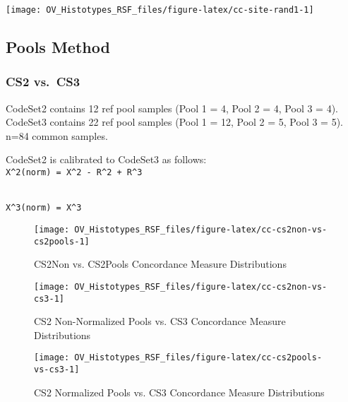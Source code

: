 \documentclass[
]{report}
\begin{document}
\begin{center}\texttt{[image: OV\_Histotypes\_RSF\_files/figure-latex/cc-site-rand1-1]} \end{center}

\hypertarget{pools-method-1}{%
\subsection{Pools Method}\label{pools-method-1}}

\hypertarget{cs2-vs.-cs3}{%
\subsubsection{CS2 vs.~CS3}\label{cs2-vs.-cs3}}

CodeSet2 contains 12 ref pool samples (Pool 1 = 4, Pool 2 = 4, Pool 3 = 4). CodeSet3 contains 22 ref pool samples (Pool 1 = 12, Pool 2 = 5, Pool 3 = 5). n=84 common samples.

CodeSet2 is calibrated to CodeSet3 as follows:\\
\texttt{X\^{}2(norm)\ =\ X\^{}2\ -\ R\^{}2\ +\ R\^{}3}\strut \\
\texttt{X\^{}3(norm)\ =\ X\^{}3}

\begin{figure}[H]

{\centering \texttt{[image: OV\_Histotypes\_RSF\_files/figure-latex/cc-cs2non-vs-cs2pools-1]} 

}

\caption{CS2Non vs. CS2Pools Concordance Measure Distributions}\label{fig:cc-cs2non-vs-cs2pools}
\end{figure}

\begin{figure}[H]

{\centering \texttt{[image: OV\_Histotypes\_RSF\_files/figure-latex/cc-cs2non-vs-cs3-1]} 

}

\caption{CS2 Non-Normalized Pools vs. CS3 Concordance Measure Distributions}\label{fig:cc-cs2non-vs-cs3}
\end{figure}

\begin{figure}[H]

{\centering \texttt{[image: OV\_Histotypes\_RSF\_files/figure-latex/cc-cs2pools-vs-cs3-1]} 

}

\caption{CS2 Normalized Pools vs. CS3 Concordance Measure Distributions}\label{fig:cc-cs2pools-vs-cs3}
\end{figure}
\end{document}
